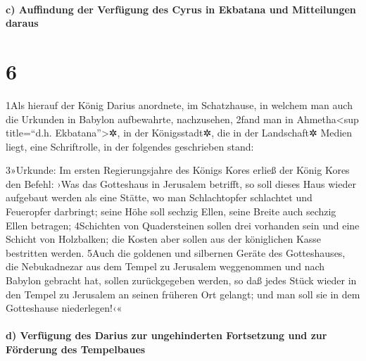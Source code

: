\hypertarget{c-auffindung-der-verfuxfcgung-des-cyrus-in-ekbatana-und-mitteilungen-daraus}{%
\paragraph{c) Auffindung der Verfügung des Cyrus in Ekbatana und
Mitteilungen
daraus}\label{c-auffindung-der-verfuxfcgung-des-cyrus-in-ekbatana-und-mitteilungen-daraus}}

\hypertarget{section-5}{%
\section{6}\label{section-5}}

1Als hierauf der König Darius anordnete, im Schatzhause, in welchem man
auch die Urkunden in Babylon aufbewahrte, nachzusehen, 2fand man in
Ahmetha\textless sup title=``d.h. Ekbatana''\textgreater✲, in der
Königsstadt✲, die in der Landschaft✲ Medien liegt, eine Schriftrolle, in
der folgendes geschrieben stand:

3»Urkunde: Im ersten Regierungsjahre des Königs Kores erließ der König
Kores den Befehl: ›Was das Gotteshaus in Jerusalem betrifft, so soll
dieses Haus wieder aufgebaut werden als eine Stätte, wo man
Schlachtopfer schlachtet und Feueropfer darbringt; seine Höhe soll
sechzig Ellen, seine Breite auch sechzig Ellen betragen; 4Schichten von
Quadersteinen sollen drei vorhanden sein und eine Schicht von
Holzbalken; die Kosten aber sollen aus der königlichen Kasse bestritten
werden. 5Auch die goldenen und silbernen Geräte des Gotteshauses, die
Nebukadnezar aus dem Tempel zu Jerusalem weggenommen und nach Babylon
gebracht hat, sollen zurückgegeben werden, so daß jedes Stück wieder in
den Tempel zu Jerusalem an seinen früheren Ort gelangt; und man soll sie
in dem Gotteshause niederlegen!‹«

\hypertarget{d-verfuxfcgung-des-darius-zur-ungehinderten-fortsetzung-und-zur-fuxf6rderung-des-tempelbaues}{%
\paragraph{d) Verfügung des Darius zur ungehinderten Fortsetzung und zur
Förderung des
Tempelbaues}\label{d-verfuxfcgung-des-darius-zur-ungehinderten-fortsetzung-und-zur-fuxf6rderung-des-tempelbaues}}

